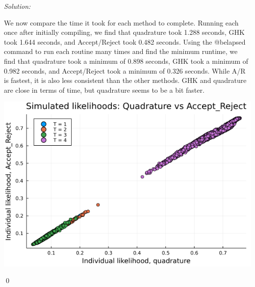 \documentclass[12pt]{article}
\newenvironment{problem}[2][Problem]{\begin{trivlist}
\item[\hskip \labelsep {\bfseries #1}\hskip \labelsep {\bfseries #2.}]}{\end{trivlist}}
\newenvironment{sol}
    {\emph{Solution:}
    }
    {
    \qed
    }
\begin{document}
\begin{sol}
We now compare the time it took for each method to complete. Running each once after initially compiling, we find that quadrature took 1.288 seconds, GHK took 1.644 seconds, and Accept/Reject took 0.482 seconds. Using the @belapsed command to run each routine many times and find the minimum runtime, we find that quadrature took a minimum of 0.898 seconds, GHK took a minimum of 0.982 seconds, and Accept/Reject took a minimum of 0.326 seconds. While A/R is fastest, it is also less consistent than the other methods. GHK and quadrature are close in terms of time, but quadrature seems to be a bit faster. 
    \begin{center}
        \includegraphics[scale=0.5]{Accept_Reject_comp.png}
    \end{center}
\end{sol}
\begin{problem}{5}
\end{problem}
\end{document}
